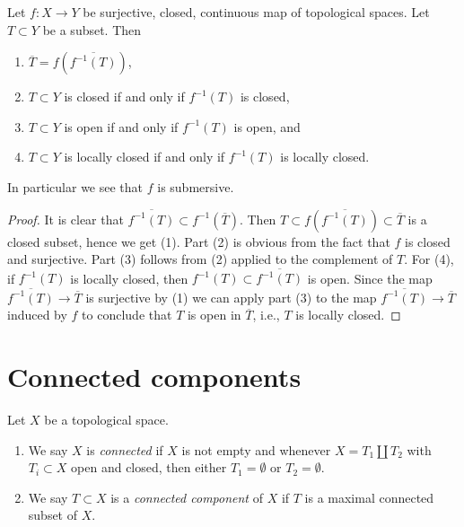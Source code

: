 \begin{lemma}
\label{lemma-closed-morphism-quotient-topology}
Let $f : X \to Y$ be surjective, closed, continuous map of topological spaces.
Let $T \subset Y$ be a subset. Then
\begin{enumerate}
\item $\overline{T} = f(\overline{f^{-1}(T)})$,
\item $T \subset Y$ is closed if and only if $f^{-1}(T)$ is closed,
\item $T \subset Y$ is open if and only if $f^{-1}(T)$ is open, and
\item $T \subset Y$ is locally closed if and only if
$f^{-1}(T)$ is locally closed.
\end{enumerate}
In particular we see that $f$ is submersive.
\end{lemma}

\begin{proof}
It is clear that $\overline{f^{-1}(T)} \subset f^{-1}(\overline{T})$.
Then $T \subset f(\overline{f^{-1}(T)}) \subset \overline{T}$
is a closed subset, hence we get (1). Part (2) is obvious from
the fact that $f$ is closed and surjective.
Part (3) follows from (2) applied to the complement of $T$.
For (4), if $f^{-1}(T)$ is locally closed, then
$f^{-1}(T) \subset \overline{f^{-1}(T)}$ is open.
Since the map $\overline{f^{-1}(T)} \to \overline{T}$ is surjective
by (1) we can apply part (3) to the map $\overline{f^{-1}(T)} \to \overline{T}$
induced by $f$ to conclude that $T$ is open in
$\overline{T}$, i.e., $T$ is locally closed.
\end{proof}










\section{Connected components}
\label{section-connected-components}

\begin{definition}
\label{definition-connected-components}
Let $X$ be a topological space.
\begin{enumerate}
\item We say $X$ is {\it connected} if $X$ is not empty and whenever
$X = T_1 \amalg T_2$ with $T_i \subset X$ open and closed, then either
$T_1 = \emptyset$ or $T_2 = \emptyset$.
\item We say $T \subset X$ is a {\it connected component} of $X$ if
$T$ is a maximal connected subset of $X$.
\end{enumerate}
\end{definition}


